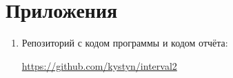 \section{Приложения} \label{app}

\begin{enumerate}
	\item Репозиторий с кодом программы и кодом отчёта:
	
	\href{https://github.com/kystyn/interval}{https://github.com/kystyn/interval2}

\end{enumerate}